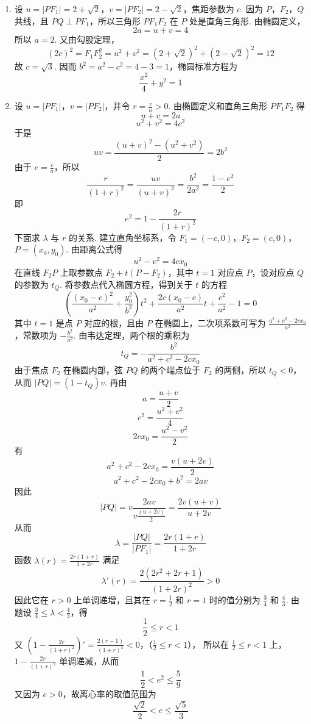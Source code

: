 \begin{solution}
\begin{enumerate}
\item 设 \(u=|PF_1|=2+\sqrt{2}\)，\(v=|PF_2|=2-\sqrt{2}\)，焦距参数为 \(c\). 因为 \(P\)，\(F_2\)，\(Q\) 共线，且 \(PQ\perp PF_1\)，所以三角形 \(PF_1F_2\) 在 \(P\) 处是直角三角形. 由椭圆定义，
\[
2a=u+v=4
\]
所以 \(a=2\). 又由勾股定理，
\[
(2c)^2=F_1F_2^2=u^2+v^2=(2+\sqrt{2})^2+(2-\sqrt{2})^2=12
\]
故 \(c=\sqrt{3}\). 因而 \(b^2=a^2-c^2=4-3=1\)，椭圆标准方程为
\[
\frac{x^2}{4}+y^2=1
\]
\item 设 \(u=|PF_1|\)，\(v=|PF_2|\)，并令 \(r=\frac{v}{u}>0\). 由椭圆定义和直角三角形 \(PF_1F_2\) 得
\[
u+v=2a
\]
\[
u^2+v^2=4c^2
\]
于是
\[
uv=\frac{(u+v)^2-(u^2+v^2)}{2}=2b^2
\]
由于 \(e=\frac{c}{a}\)，所以
\[
\frac{r}{(1+r)^2}=\frac{uv}{(u+v)^2}=\frac{b^2}{2a^2}=\frac{1-e^2}{2}
\]
即
\[
e^2=1-\frac{2r}{(1+r)^2}
\]
下面求 \(\lambda\) 与 \(r\) 的关系. 建立直角坐标系，令 \(F_1=(-c,0)\)，\(F_2=(c,0)\)，\(P=(x_0,y_0)\). 由距离公式得
\[
u^2-v^2=4cx_0
\]
在直线 \(F_2P\) 上取参数点 \(F_2+t(P-F_2)\)，其中 \(t=1\) 对应点 \(P\)，设对应点 \(Q\) 的参数为 \(t_Q\). 将参数点代入椭圆方程，得到关于 \(t\) 的方程
\[
\left(\frac{(x_0-c)^2}{a^2}+\frac{y_0^2}{b^2}\right)t^2+\frac{2c(x_0-c)}{a^2}t+\frac{c^2}{a^2}-1=0
\]
其中 \(t=1\) 是点 \(P\) 对应的根，且由 \(P\) 在椭圆上，二次项系数可写为 \(\frac{a^2+c^2-2cx_0}{a^2}\)，常数项为 \(-\frac{b^2}{a^2}\). 由韦达定理，两个根的乘积为
\[
t_Q=-\frac{b^2}{a^2+c^2-2cx_0}
\]
由于焦点 \(F_2\) 在椭圆内部，弦 \(PQ\) 的两个端点位于 \(F_2\) 的两侧，所以 \(t_Q<0\)，从而 \(|PQ|=(1-t_Q)v\). 再由
\[
a=\frac{u+v}{2}
\]
\[
c^2=\frac{u^2+v^2}{4}
\]
\[
2cx_0=\frac{u^2-v^2}{2}
\]
有
\[
a^2+c^2-2cx_0=\frac{v(u+2v)}{2}
\]
\[
a^2+c^2-2cx_0+b^2=2av
\]
因此
\[
|PQ|=v\frac{2av}{v\frac{(u+2v)}{2}}=\frac{2v(u+v)}{u+2v}
\]
从而
\[
\lambda=\frac{|PQ|}{|PF_1|}=\frac{2r(1+r)}{1+2r}
\]
函数 \(\lambda(r)=\frac{2r(1+r)}{1+2r}\) 满足
\[
\lambda'(r)=\frac{2(2r^{2}+2r+1)}{(1+2r)^{2}}>0
\]
因此它在 \(r>0\) 上单调递增，且其在 \(r=\frac{1}{2}\) 和 \(r=1\) 时的值分别为 \(\frac{3}{4}\) 和 \(\frac{4}{3}\). 由题设 \(\frac{3}{4}\leqslant\lambda<\frac{4}{3}\)，得
\[
\frac{1}{2}\leqslant r<1
\]
又
\(\left(1-\frac{2r}{(1+r)^2}\right)'=\frac{2(r-1)}{(1+r)^3}<0\)，（\(\frac{1}{2}\leqslant r<1\)），
所以在 \(\frac{1}{2}\leqslant r<1\) 上，\(1-\frac{2r}{(1+r)^2}\) 单调递减，从而
\[
\frac{1}{2}<e^2\leqslant\frac{5}{9}
\]
又因为 \(e>0\)，故离心率的取值范围为
\[
\frac{\sqrt{2}}{2}<e\leqslant\frac{\sqrt{5}}{3}
\]
\end{enumerate}
\end{solution}
